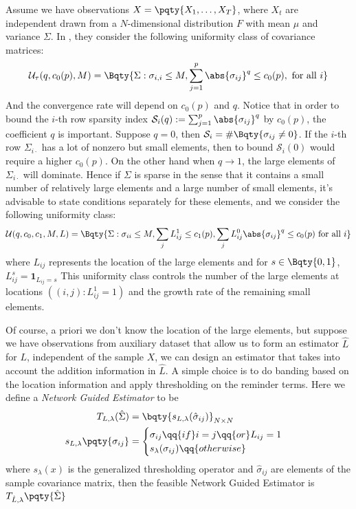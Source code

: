 Assume we have observations \(X = \pqty{X_{1}, \dots, X_{T}}\), where \(X_{t}\) are independent drawn from a \(N\)-dimensional distribution \(F\) with mean \(\mu\) and variance \(\Sigma\). In \cite{bickel2008CovarianceRegularization}, they consider the following uniformity class of covariance matrices:
\begin{equation*}
    \mathcal{U}_{\tau}(q, c_{0}(p) , M) = \Bqty{\Sigma: \sigma_{i,i} \leq M, \sum_{j=1}^{p} \abs{\sigma_{ij}}^{q} \leq c_{0}(p), \mbox{ for all } i}
\end{equation*}
And the convergence rate will depend on \(c_{0}(p)\) and \(q\). Notice that in order to bound the \(i\)-th row sparsity index \(\mathcal{S}_{i}(q) := \sum_{j=1}^{p} \abs{\sigma_{ij}}^{q}\) by \(c_{0}(p)\), the coefficient \(q\) is important. Suppose \(q = 0\), then \(\mathcal{S}_{i} = \#\Bqty{\sigma_{ij} \neq 0}\). If the \(i\)-th row \(\Sigma_{i\cdot}\) has a lot of nonzero but small elements, then to bound \(\mathcal{S}_{i}(0)\) would require a higher \(c_{0}(p)\). On the other hand when \(q \to 1\), the large elements of \(\Sigma_{i \cdot}\) will dominate. Hence if \(\Sigma\) is sparse in the sense that it contains a small number of relatively large elements and a large number of small elements, it's advisable to state conditions separately for these elements, and we consider the following uniformity class:
\begin{align*}
    \mathcal{U}(q, c_{0}, c_{1}, M, L) = \Bqty{\Sigma : \sigma_{ii} \leq M, \sum_{j} L_{ij}^{1} \leq c_{1}(p), \sum_{j} L_{ij}^{0}\abs{\sigma_{ij}}^{q} \leq c_{0}(p) \mbox{ for all } i}
\end{align*}
where \(L_{ij}\) represents the location of the large elements and for \(s \in \Bqty{0,1}\), \(L_{ij}^{s} = \mathbf{1}_{L_{ij} = s}\) This uniformity class controls the number of the large elements at locations \(((i,j): L_{ij}^{1} = 1)\) and the growth rate of the remaining small elements. 

Of course, a priori we don't know the location of the large elements, but suppose we have observations from auxiliary dataset that allow us to form an estimator \(\hat{L}\) for \(L\), independent of the sample \(X\), we can design an estimator that takes into account the addition information in \(\hat{L}\). A simple choice is to do banding based on the location information and apply thresholding on the reminder terms. Here we define a \textit{Network Guided Estimator} to be
\begin{align*}
    T_{L,\lambda}(\hat{\Sigma}) &= \bqty{s_{L, \lambda } (\hat{\sigma}_{ij})}_{N\times N}\\
    s_{L,\lambda} \pqty{\sigma_{ij}} &= 
    \begin{cases}
        \sigma_{ij} \qq{if} i = j \qq{or} L_{ij} = 1\\ 
        s_{\lambda}(\sigma_{ij}) \qq{otherwise} 
    \end{cases}
\end{align*}
where \(s_{\lambda}(x)\) is the generalized thresholding operator and \(\hat{\sigma}_{ij}\) are elements of the sample covariance matrix, then the feasible Network Guided Estimator is \(T_{\hat{L},\lambda}\pqty{\hat{\Sigma}}\)

